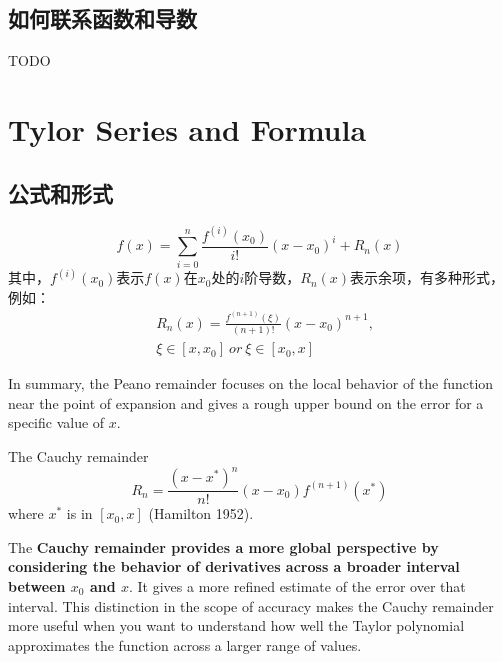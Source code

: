 \subsection{如何联系函数和导数}

TODO

\section{Tylor Series and Formula} \label{tylor}

\subsection{公式和形式}

\begin{definition}[泰勒公式的一般形式]
	\begin{equation}
		f(x)=\sum_{i=0}^{n}{\frac{f^{(i)}(x_0)}{i!}(x-x_0)^i}+R_n(x)
	\end{equation}
	其中，$f^{(i)}(x_0)$表示$f(x)$在$x_0$处的$i$阶导数，$R_n(x)$表示余项，有多种形式，例如：
	\begin{align*}
		&R_n(x)=\frac{f^{(n+1)}(\xi)}{(n+1)!}(x-x_0)^{n+1}, \\ &\xi \in [x,x_0]\ or \ \xi \in [x_0,x]
	\end{align*}
\end{definition}

In summary, the Peano remainder focuses on 
the local behavior of the function near the point of expansion 
and gives a rough upper bound on the error for a specific value of $x$. 
\begin{definition}{The Cauchy remainder}
    \[
        R_n=\dfrac{(x-x^*)^n}{n!}(x-x_0)f^{(n+1)}(x^*)
    \]
    where $x^*$ is in $[x_0,x]$ (Hamilton 1952).
\end{definition}
The \textbf{Cauchy remainder provides a more global perspective by 
considering the behavior of derivatives across a broader 
interval between $x_0$ and $x$}. It gives a more refined estimate 
of the error over that interval. This distinction in the scope 
of accuracy makes the Cauchy remainder more useful when you want 
to understand how well the Taylor polynomial approximates the function 
across a larger range of values.

